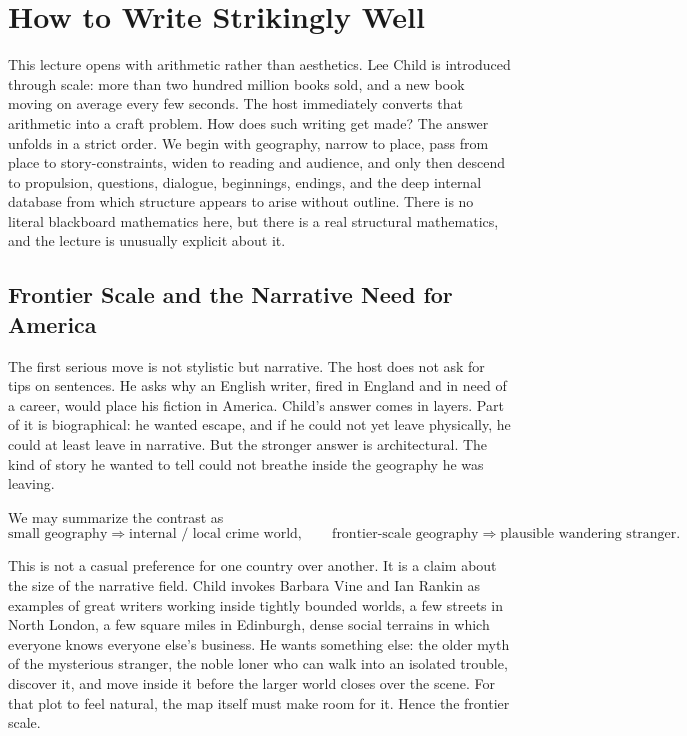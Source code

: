 \chapter{How to Write Strikingly Well}

This lecture opens with arithmetic rather than aesthetics. Lee Child is introduced through scale: more than two hundred million books sold, and a new book moving on average every few seconds. The host immediately converts that arithmetic into a craft problem. How does such writing get made? The answer unfolds in a strict order. We begin with geography, narrow to place, pass from place to story-constraints, widen to reading and audience, and only then descend to propulsion, questions, dialogue, beginnings, endings, and the deep internal database from which structure appears to arise without outline. There is no literal blackboard mathematics here, but there is a real structural mathematics, and the lecture is unusually explicit about it.

\section{Frontier Scale and the Narrative Need for America}

The first serious move is not stylistic but narrative. The host does not ask for tips on sentences. He asks why an English writer, fired in England and in need of a career, would place his fiction in America. Child's answer comes in layers. Part of it is biographical: he wanted escape, and if he could not yet leave physically, he could at least leave in narrative. But the stronger answer is architectural. The kind of story he wanted to tell could not breathe inside the geography he was leaving.

We may summarize the contrast as
\begin{equation}
\text{small geography} \Longrightarrow \text{internal / local crime world}, \qquad
\text{frontier-scale geography} \Longrightarrow \text{plausible wandering stranger}.
\end{equation}

This is not a casual preference for one country over another. It is a claim about the size of the narrative field. Child invokes Barbara Vine and Ian Rankin as examples of great writers working inside tightly bounded worlds, a few streets in North London, a few square miles in Edinburgh, dense social terrains in which everyone knows everyone else's business. He wants something else: the older myth of the mysterious stranger, the noble loner who can walk into an isolated trouble, discover it, and move inside it before the larger world closes over the scene. For that plot to feel natural, the map itself must make room for it. Hence the frontier scale.

